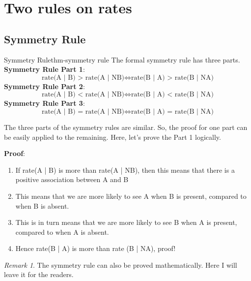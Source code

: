 \documentclass[math,code]{amznotes}
\theoremstyle{remark}
\newtheorem*{remark}{Remark}
\begin{document}
\section{Two rules on rates}
\subsection{Symmetry Rule}
\begin{thmbox}{Symmetry Rule}{thm-symmetry rule}
    The formal symmetry rule has three parts. \\
    \textbf{Symmetry Rule Part 1}:
    \begin{displaymath}
        \text{rate(A | B) > rate(A | NB)} \Leftrightarrow \text{rate(B | A) > rate(B | NA)}
    \end{displaymath}
    \textbf{Symmetry Rule Part 2}:
    \begin{displaymath}
        \text{rate(A | B) < rate(A | NB)} \Leftrightarrow \text{rate(B | A) < rate(B | NA)}
    \end{displaymath}
        \textbf{Symmetry Rule Part 3}:
    \begin{displaymath}
        \text{rate(A | B) = rate(A | NB)} \Leftrightarrow \text{rate(B | A) = rate(B | NA)}
    \end{displaymath}
\end{thmbox}
The three parts of the symmetry rules are similar. So, the proof for one part can be easily applied to the remaining. Here, let's prove the Part 1 logically.

\textbf{Proof}:
\begin{enumerate}
    \item If rate(A | B) is more than rate(A | NB), then this means that there is a positive association between A and B
    \item This means that we are more likely to see A when B is present, compared to when B is absent.
    \item This is in turn means that we are more likely to see B when A is present, compared to when A is absent.
    \item Hence rate(B | A) is more than rate (B | NA), proof!
\end{enumerate}
\begin{notebox}
    \begin{remark}
        The symmetry rule can also be proved mathematically. Here I will leave it for the readers.
    \end{remark}
\end{notebox}
\end{document}
